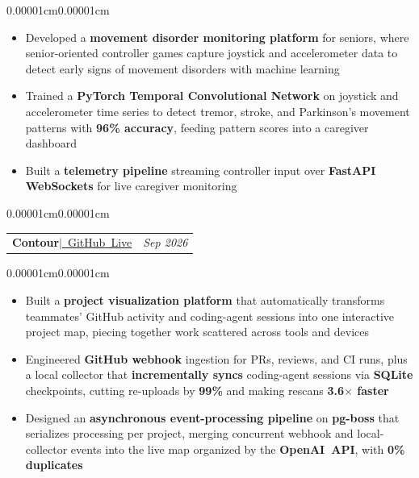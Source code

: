 \documentclass[10pt, letterpaper]{article}
\makeatletter
\newenvironment{highlights}{
    \begin{itemize}[
        topsep=0.10 cm,
        parsep=0.10 cm,
        partopsep=0pt,
        itemsep=0pt,
        leftmargin=10pt
    ]
}{
    \end{itemize}
}
\newenvironment{onecolentry}{
    \begin{adjustwidth}{0.00001cm}{0.00001cm}
}{
    \end{adjustwidth}
}
\newenvironment{twocolentry}[2][]{
    \onecolentry
    \def\secondColumn{#2}
    \begin{tabular*}{\linewidth}{@{}l@{\extracolsep{\fill}}r@{}}
}{
    & \secondColumn
    \end{tabular*}
    \endonecolentry
}
\makeatother
\begin{document}
\vspace{0.10 cm}

\begin{onecolentry}
\begin{highlights}
\item Developed a \textbf{movement disorder monitoring platform} for seniors, where senior-oriented controller games capture joystick and accelerometer data to detect early signs of movement disorders with machine learning
\item Trained a \textbf{PyTorch Temporal Convolutional Network} on joystick and accelerometer time series to detect tremor, stroke, and Parkinson's movement patterns with \textbf{96\% accuracy}, feeding pattern scores into a caregiver dashboard
\item Built a \textbf{telemetry pipeline} streaming controller input over \textbf{FastAPI WebSockets} for live caregiver monitoring
\end{highlights}
\end{onecolentry}

\vspace{0.20 cm}

\begin{twocolentry}{\textit{Sep 2026}}
    \textbf{Contour}\hspace{0.20cm}$|$\hspace{0.20cm}\href{https://github.com/bryanlaiwei/Contour}{\faGithub~GitHub}\hspace{0.20cm}\href{https://contourmaps.vercel.app}{\faGlobe~Live}
\end{twocolentry}

\vspace{0.10 cm}

\begin{onecolentry}
\begin{highlights}
\item Built a \textbf{project visualization platform} that automatically transforms teammates' GitHub activity and coding-agent sessions into one interactive project map, piecing together work scattered across tools and devices
\item Engineered \textbf{GitHub webhook} ingestion for PRs, reviews, and CI runs, plus a local collector that \textbf{incrementally syncs} coding-agent sessions via \textbf{SQLite} checkpoints, cutting re-uploads by \textbf{99\%} and making rescans \textbf{3.6$\times$ faster}
\item Designed an \textbf{asynchronous event-processing pipeline} on \textbf{pg-boss} that serializes processing per project, merging concurrent webhook and local-collector events into the live map organized by the \textbf{OpenAI~API}, with \textbf{0\% duplicates}
\end{highlights}
\end{onecolentry}
\end{document}
